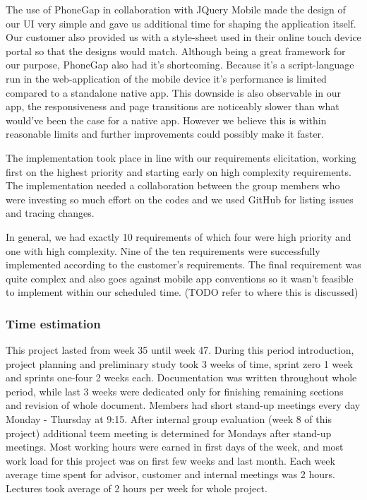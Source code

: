 The use of PhoneGap in collaboration with JQuery Mobile made the design of our UI very simple and gave us additional time for shaping the application itself.
Our customer also provided us with a style-sheet used in their online touch device portal so that the designs would match.
Although being a great framework for our purpose, PhoneGap also had it's shortcoming.
Because it's a script-language run in the web-application of the mobile device it's performance is limited compared to a standalone native app.
This downside is also observable in our app, the responsiveness and page transitions are noticeably slower than what would've been the case for a native app.
However we believe this is within reasonable limits and further improvements could possibly make it faster.

The implementation took place in line with our requirements elicitation, working first on the highest priority and starting early on high complexity requirements.
The implementation needed a collaboration between the group members who were investing so much effort on the codes and we used GitHub for listing issues and tracing changes.

In general, we had exactly 10 requirements of which four were high priority and one with high complexity.
Nine of the ten requirements were successfully implemented according to the customer's requirements.
The final requirement was quite complex and also goes against mobile app conventions so it wasn't feasible to implement within our scheduled time. (TODO refer to where this is discussed)

	\subsubsection{Time estimation}
	This project lasted from week 35 until week 47. During this period introduction, project planning and preliminary study took 3 weeks of time, sprint zero 1 week and sprints one-four 2 weeks each. Documentation was written throughout whole period, while last 3 weeks were dedicated only for finishing remaining sections and revision of whole document.\newline
	Members had short stand-up meetings every day Monday - Thursday at 9:15. After internal group evaluation (week 8 of this project) additional teem meeting is determined for Mondays after stand-up meetings. Most working hours were earned in first days of the week, and most work load for this project was on first few weeks and last month.\newline	
	Each week average time spent for advisor, customer and internal meetings was 2 hours. Lectures took average of 2 hours per week for whole project.
	

